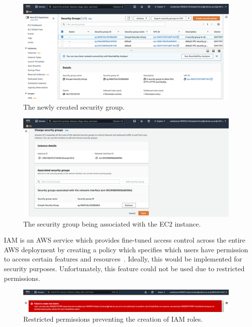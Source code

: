 \begin{figure}[!htbp]
    \centering
    \includegraphics[width=\textwidth]{resources/security/security-group-created}
    \caption{The newly created security group.}
    \label{fig:iam-denied}
\end{figure}

\begin{figure}[!htbp]
    \centering
    \includegraphics[width=\textwidth]{resources/security/security-group-associated}
    \caption{The security group being associated with the EC2 instance.}
    \label{fig:iam-denied}
\end{figure}

IAM is an AWS service which provides fine-tuned access control across the entire AWS deployment by creating a policy
which specifies which users have permission to access certain features and resources~\parencite{amazon2022aws2}.
Ideally, this would be implemented for security purposes.
Unfortunately, this feature could not be used due to restricted permissions.

\begin{figure}[!htbp]
    \centering
    \includegraphics[width=\textwidth]{resources/iam-denied}
    \caption{Restricted permissions preventing the creation of IAM roles.}
    \label{fig:iam-denied}
\end{figure}

